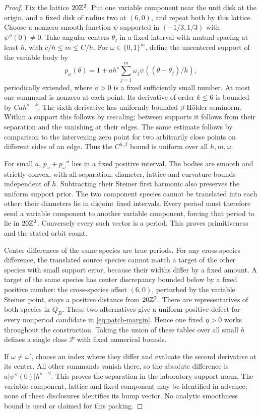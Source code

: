 \begin{proof}
Fix the lattice $20\mathbb Z^2$. Put one variable component near the unit
disk at the origin, and a fixed disk of radius two at $(6,0)$, and
repeat both by this lattice. Choose a nonzero smooth function
$\psi$ supported in $(-1/3,1/3)$ with $\psi''(0)\ne0$.
Take angular centers $\theta_j$ in a fixed interval with mutual
spacing at least $h$, with $c/h\le m\le C/h$. For
$\omega\in\{0,1\}^m$, define the uncentered support of the variable
body by
\begin{equation}\label{eq:packing}
 p_\omega(\theta)=1+a h^s
                   \sum_{j=1}^m\omega_j\psi((\theta-\theta_j)/h),
\end{equation}
periodically extended, where $a>0$ is a fixed sufficiently small
number. At most one summand is nonzero at each point. Its derivative
of order $k\le6$ is bounded by $Ca h^{s-k}$. The sixth derivative
has uniformly bounded $\beta$-H\"older seminorm. Within a support
this follows by rescaling; between supports it follows from their
separation and the vanishing at their edges. The same estimate follows
by comparison to the intervening zero point for two arbitrarily close
points on different sides of an edge. Thus the $C^{6,\beta}$ bound
is uniform over all $h,m,\omega$.

For small $a$, $p_\omega+p_\omega''$ lies in a fixed positive interval.
The bodies are smooth and strictly convex, with all separation,
diameter, lattice and curvature bounds independent of $h$. Subtracting
their Steiner first harmonic also preserves the uniform support prior.
The two component species cannot be translated into each other:
their diameters lie in disjoint fixed intervals. Every period must
therefore send a variable component to another variable component,
forcing that period to lie in $20\mathbb Z^2$. Conversely every such vector
is a period. This proves primitiveness and the stated orbit count.

Center differences of the same species are true periods. For any
cross-species difference, the translated source species cannot match
a target of the other species with small support error, because their
widths differ by a fixed amount. A target of the same species has
center discrepancy bounded below by a fixed positive number: the
cross-species offset $(6,0)$, perturbed by the variable Steiner point,
stays a positive distance from $20\mathbb Z^2$. There are representatives
of both species in $Q_B$. These two alternatives give a uniform
positive defect for every nonperiod candidate in
\eqref{eq:patch-margin}. Hence one fixed $\eta>0$ works throughout
the construction. Taking the union of these tables over all small
$h$ defines a single class $\mathcal P$ with fixed numerical bounds.

If $\omega\ne\omega'$, choose an index where they differ and evaluate
the second derivative at its center. All other summands vanish there,
so the absolute difference is $a|\psi''(0)|h^{s-2}$. This proves the
separation in the laboratory support norm. The variable component,
lattice and fixed component may be identified in advance; none of
these disclosures identifies its bump vector. No analytic smoothness
bound is used or claimed for this packing.
\end{proof}

